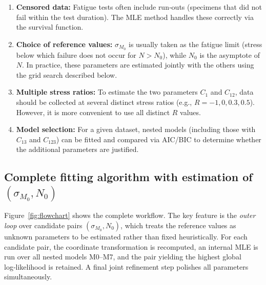 \begin{enumerate}
    \item \textbf{Censored data:} Fatigue tests often include run‑outs (specimens that did not fail within the test duration). The MLE method handles these correctly via the survival function.
    \item \textbf{Choice of reference values:} \(\sigma_{M_0}\) is usually taken as the fatigue limit (stress below which failure does not occur for \(N > N_0\)), while \(N_0\) is the asymptote of \(N\). In practice, these parameters are estimated jointly with the others using the grid search described below.
    \item \textbf{Multiple stress ratios:} To estimate the two parameters \(C_1\) and \(C_{12}\), data should be collected at several distinct stress ratios (e.g., \(R = -1, 0, 0.3, 0.5\)). However, it is more convenient to use all distinct \(R\) values.
    \item \textbf{Model selection:} For a given dataset, nested models (including those with \(C_{13}\) and \(C_{123}\)) can be fitted and compared via AIC/BIC to determine whether the additional parameters are justified.
\end{enumerate}

\subsection{Complete fitting algorithm with estimation of \((\sigma_{M_0}, N_0)\)}

Figure~\ref{fig:flowchart} shows the complete workflow. The key feature is the \emph{outer loop} over candidate pairs \((\sigma_{M_0},N_0)\), which treats the reference values as unknown parameters to be estimated rather than fixed heuristically. For each candidate pair, the coordinate transformation is recomputed, an internal MLE is run over all nested models M0–M7, and the pair yielding the highest global log‑likelihood is retained. A final joint refinement step polishes all parameters simultaneously.

